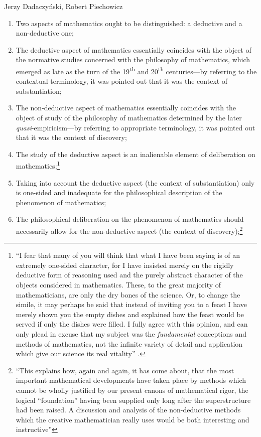 \begin{artengenv}{Jerzy Dadaczyński, Robert Piechowicz}
\begin{enumerate}
\item Two aspects of mathematics ought to be distinguished: a deductive and a non-deductive one;
\item The deductive aspect of mathematics essentially coincides with the object of the normative studies concerned with the philosophy of mathematics, which emerged as late as the turn of the 19\textsuperscript{th} and 20\textsuperscript{th} centuries---by referring to the contextual terminology, it was pointed out that it was the context of substantiation;
\item The non-deductive aspect of mathematics essentially coincides with the object of study of the philosophy of mathematics determined by the later \textit{quasi}-empiricism---by referring to appropriate terminology, it was pointed out that it was the context of discovery;
\item The study of the deductive aspect is an inalienable element of deliberation on mathematics;\footnote{``I fear that many of you will think that what I have been saying is of an extremely one-sided character, for I have insisted merely on the rigidly deductive form of reasoning used and the purely abstract character of the objects considered in mathematics. These, to the great majority of mathematicians, are only the dry bones of the science. Or, to change the simile, it may perhaps be said that instead of inviting you to a feast I have merely shown you the empty dishes and explained how the feast would be served if only the dishes were filled. I fully agree with this opinion, and can only plead in excuse that my subject was the \textit{fundamental} conceptions and methods of mathematics, not the infinite variety of detail and application which give our science its real vitality''
\parencite[][p.132]{bocher_fundamental_1904}.%
}
\item Taking into account the deductive aspect (the context of substantiation) only is one-sided and inadequate for the philosophical description of the phenomenon of mathematics;
\item The philosophical deliberation on the phenomenon of mathematics should necessarily allow for the non-deductive aspect (the context of discovery);\footnote{``This explains how, again and again, it has come about, that the most important mathematical developments have taken place by methods which cannot be wholly justified by our present canons of mathematical rigor, the logical ``foundation'' having been supplied only long after the superstructure had been raised. A discussion and analysis of the non-deductive methods which the creative mathematician really uses would be both interesting and instructive''
}
\end{enumerate}
\end{artengenv}
